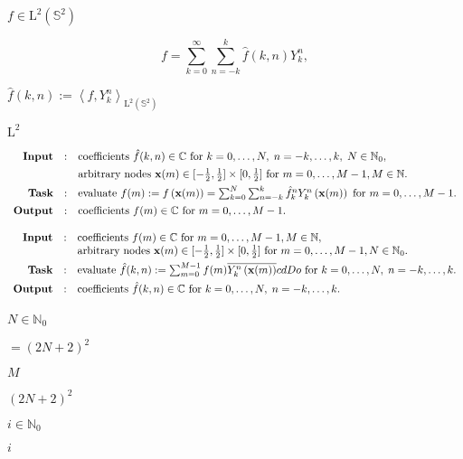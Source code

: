 \documentclass{article}
\begin{document}
$f \in \mathrm{L}^2\left(\mathbb{S}^2\right)$
\pagebreak

\[ f = \sum_{k=0}^{\infty} \sum_{n=-k}^{k} \hat{f}(k,n) Y_k^n, \]
\pagebreak

$\hat{f}(k,n) := \left< f, Y_k^{n} \right>_{\mathrm{L}^2\left(\mathbb{S}^2\right)}$
\pagebreak

$\mathrm{L}^2$
\pagebreak

\[ \begin{array}{rcl} \text{\textbf{Input}} & : & \text{coefficients } \hat{f}(k,n) \in \mathbb{C} \text{ for } k=0,\ldots,N,\;n=-k, \ldots,k,\; N \in \mathbb{N}_0,\\[1ex] & & \text{arbitrary nodes } \mathbf{x}(m) \in [-\frac{1}{2},\frac{1}{2}] \times [0,\frac{1}{2}] \text{ for } m=0,\ldots,M-1, M \in \mathbb{N}. \\[1ex] \text{\textbf{Task}} & : & \text{evaluate } f(m) := f\left( \mathbf{x}(m)\right) = \sum_{k=0}^N \sum_{n=-k}^k \hat{f}_k^n Y_k^n\left(\mathbf{x}(m)\right) \text{ for } m=0,\ldots,M-1. \\[1ex] \text{\textbf{Output}} & : & \text{coefficients } f(m) \in \mathbb{C} \text{ for } m=0,\ldots,M-1.\\ \end{array} \]
\pagebreak

\[ \begin{array}{rcl} \text{\textbf{Input}} & : & \text{coefficients } f(m) \in \mathbb{C} \text{ for } m=0,\ldots,M-1, M \in \mathbb{N},\\ & & \text{arbitrary nodes } \mathbf{x}(m) \in [-\frac{1}{2},\frac{1}{2}] \times [0,\frac{1}{2}] \text{ for } m=0,\ldots,M-1, N \in \mathbb{N}_0.\\[1ex] \text{\textbf{Task}} & : & \text{evaluate } \hat{f}(k,n) := \sum_{m=0}^{M-1} f(m) \overline{Y_k^n\left(\mathbf{x}(m)\right)}cd Do \text{ for } k=0,\ldots,N,\;n=-k,\ldots,k.\\[1ex] \text{\textbf{Output}} & : & \text{coefficients } \hat{f}(k,n) \in \mathbb{C} \text{ for } k=0,\ldots,N,\;n=-k,\ldots,k.\\[1ex] \end{array} \]
\pagebreak

$N \in \mathbb{N}_0$
\pagebreak

$ = (2N+2)^2$
\pagebreak

$M$
\pagebreak

$(2N+2)^2$
\pagebreak

$i \in \mathbb{N}_0$
\pagebreak

$i$
\pagebreak
\end{document}
